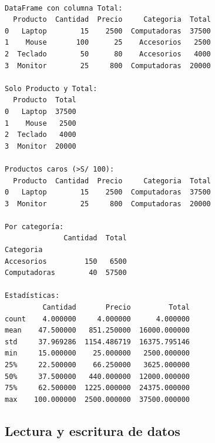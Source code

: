 \documentclass[
  doc,
  floatsintext,
  longtable,
  a4paper,
  nolmodern,
  notxfonts,
  notimes,
  12pt,
  colorlinks=true,linkcolor=blue,citecolor=blue,urlcolor=blue]{apa7}
\begin{document}
\begin{verbatim}

DataFrame con columna Total:
  Producto  Cantidad  Precio     Categoria  Total
0   Laptop        15    2500  Computadoras  37500
1    Mouse       100      25    Accesorios   2500
2  Teclado        50      80    Accesorios   4000
3  Monitor        25     800  Computadoras  20000

Solo Producto y Total:
  Producto  Total
0   Laptop  37500
1    Mouse   2500
2  Teclado   4000
3  Monitor  20000

Productos caros (>S/ 100):
  Producto  Cantidad  Precio     Categoria  Total
0   Laptop        15    2500  Computadoras  37500
3  Monitor        25     800  Computadoras  20000

Por categoría:
              Cantidad  Total
Categoria                    
Accesorios         150   6500
Computadoras        40  57500

Estadísticas:
         Cantidad       Precio         Total
count    4.000000     4.000000      4.000000
mean    47.500000   851.250000  16000.000000
std     37.969286  1154.486719  16375.795146
min     15.000000    25.000000   2500.000000
25%     22.500000    66.250000   3625.000000
50%     37.500000   440.000000  12000.000000
75%     62.500000  1225.000000  24375.000000
max    100.000000  2500.000000  37500.000000
\end{verbatim}

\subsection{Lectura y escritura de
datos}\label{lectura-y-escritura-de-datos}
\end{document}
